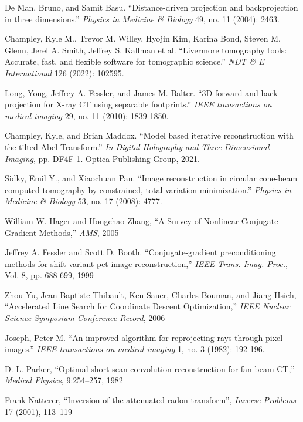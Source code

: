 \documentclass[11pt]{article}
\begin{document}
\begin{thebibliography}{100}

 De Man, Bruno, and Samit Basu. ``Distance-driven projection and backprojection in three dimensions.'' \emph{Physics in Medicine \& Biology} 49, no. 11 (2004): 2463.

 Champley, Kyle M., Trevor M. Willey, Hyojin Kim, Karina Bond, Steven M. Glenn, Jerel A. Smith, Jeffrey S. Kallman et al. ``Livermore tomography tools: Accurate, fast, and flexible software for tomographic science.'' \emph{NDT \& E International} 126 (2022): 102595.

 Long, Yong, Jeffrey A. Fessler, and James M. Balter. ``3D forward and back-projection for X-ray CT using separable footprints.'' \emph{IEEE transactions on medical imaging} 29, no. 11 (2010): 1839-1850.

 Champley, Kyle, and Brian Maddox. ``Model based iterative reconstruction with the tilted Abel Transform.'' \emph{In Digital Holography and Three-Dimensional Imaging}, pp. DF4F-1. Optica Publishing Group, 2021.

 Sidky, Emil Y., and Xiaochuan Pan. ``Image reconstruction in circular cone-beam computed tomography by constrained, total-variation minimization.'' \emph{Physics in Medicine \& Biology} 53, no. 17 (2008): 4777.

 William W. Hager and Hongchao Zhang, ``A Survey of Nonlinear Conjugate Gradient Methods,'' \emph{AMS}, 2005

Jeffrey A. Fessler and Scott D. Booth. ``Conjugate-gradient preconditioning methods for shift-variant pet image reconstruction,'' \emph{IEEE Trans. Imag. Proc.}, Vol. 8, pp. 688-699, 1999

 Zhou Yu, Jean-Baptiste Thibault, Ken Sauer, Charles Bouman, and Jiang Hsieh, ``Accelerated Line Search for Coordinate Descent
Optimization,'' \emph{IEEE Nuclear Science Symposium Conference Record}, 2006

 Joseph, Peter M. ``An improved algorithm for reprojecting rays through pixel images.'' \emph{IEEE transactions on medical imaging} 1, no. 3 (1982): 192-196.

 D. L. Parker, ``Optimal short scan convolution reconstruction for fan-beam CT,'' \emph{Medical Physics}, 9:254–257, 
1982

 Frank Natterer, ``Inversion of the attenuated radon transform'', \emph{Inverse Problems} 17 (2001), 113–119

\end{thebibliography}
\end{document}
